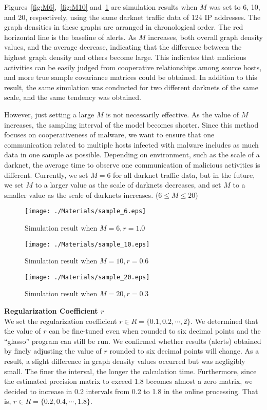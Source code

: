 \documentclass[letterpaper]{sig-alternate-10pt}
\begin{document}
Figures~\ref{fig:M6},~\ref{fig:M10} and~\ref{fig:M20} are simulation results when $M$ was set to 6, 10, and 20, respectively, using the same darknet traffic data of 124 IP addresses.
The graph densities in these graphs are arranged in chronological order.
The red horizontal line is the baseline of alerts.
As $M$ increases, both overall graph density values, and the average decrease, indicating that the difference between the highest graph density and others become large.
This indicates that malicious activities can be easily judged from cooperative relationships among source hosts, and more true sample covariance matrices could be obtained.
In addition to this result, the same simulation was conducted for two different darknets of the same scale, and the same tendency was obtained.

However, just setting a large $M$ is not necessarily effective.
As the value of $M$ increases, the sampling interval of the model becomes shorter.
Since this method focuses on cooperativeness of malware, we want to ensure that one communication related to multiple hosts infected with malware includes as much data in one sample as possible.
Depending on environment, such as the scale of a darknet, the average time to observe one communication of malicious activities is different.
Currently, we set $M=6$ for all darknet traffic data, but in the future, we set $M$ to a larger value as the scale of darknets decreases, and set $M$ to a smaller value as the scale of darknets increases. ($6 \leq M \leq 20$)

\begin{figure}[htb]
	\texttt{[image: ./Materials/sample\_6.eps]}
	\caption{Simulation result when $M = 6, r=1.0$}
  	\label{fig:M6}
	\vspace*{0.3cm}
	\texttt{[image: ./Materials/sample\_10.eps]}
	\caption{Simulation result when $M = 10, r=0.6$}
  	\label{fig:M10}
	\vspace*{0.3cm}
	\texttt{[image: ./Materials/sample\_20.eps]}
	\caption{Simulation result when $M = 20, r=0.3$}
  	\label{fig:M20}
\end{figure}

\vspace*{0.3 cm}
\noindent
\textbf{Regularization Coefficient $r$}\\
We set the regularization coefficient $r \in R=\{0.1, 0.2, \cdots, 2\}$.
We determined that the value of $r$ can be fine-tuned even when rounded to six decimal points and the ``glasso'' program can still be run.
We confirmed whether results (alerts) obtained by finely adjusting the value of $r$ rounded to six decimal points will change.
As a result, a slight difference in graph density values occurred but was negligibly small.
The finer the interval, the longer the calculation time.
Furthermore, since the estimated precision matrix to exceed 1.8 becomes almost a zero matrix, we decided to increase in 0.2 intervals from 0.2 to 1.8 in the online processing.
That is, $r \in R=\{0.2, 0.4, \cdots, 1.8\}$.
\end{document}
